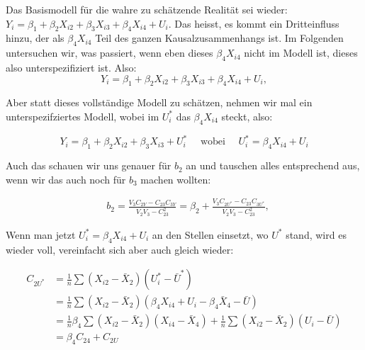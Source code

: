 \documentclass[
  10pt,
  letterpaper,
  a4paper, twoside]{scrreprt}
\begin{document}
\begin{tcolorbox}[enhanced jigsaw, coltitle=black, opacitybacktitle=0.6, toptitle=1mm, colbacktitle=quarto-callout-warning-color!10!white, colback=white, toprule=.15mm, opacityback=0, bottomrule=.15mm, arc=.35mm, colframe=quarto-callout-warning-color-frame, leftrule=.75mm, titlerule=0mm, breakable, left=2mm, rightrule=.15mm, title={IYI (∉ Klausur): Ableitung Modellspezifikation}, bottomtitle=1mm]

Das Basismodell für die wahre zu schätzende Realität sei wieder:
\(Y_i=\beta_1+\beta_2 X_{i 2}+\beta_3 X_{i 3}+\beta_4 X_{i 4} + U_i\).
Das heisst, es kommt ein Dritteinfluss hinzu, der als \(\beta_4X_{i 4}\)
Teil des ganzen Kausalzusammenhangs ist. Im Folgenden untersuchen wir,
was passiert, wenn eben dieses \(\beta_4X_{i 4}\) nicht im Modell ist,
dieses also unterspezifiziert ist. Also: \[
Y_i=\beta_1+\beta_2 X_{i 2}+\beta_3 X_{i 3}+\beta_4 X_{i 4}+U_i,
\]

Aber statt dieses vollständige Modell zu schätzen, nehmen wir mal ein
unterspezifziertes Modell, wobei im \(U_i^*\) das \(\beta_4X_{i 4}\)
steckt, also:

\[
Y_i=\beta_1+\beta_2 X_{i 2}+\beta_3 X_{i 3}+U_i^* \quad \text { wobei } \quad U_i^*=\beta_4 X_{i 4}+U_i
\]

Auch das schauen wir uns genauer für \(b_2\) an und tauschen alles
entsprechend aus, wenn wir das auch noch für \(b_3\) machen wollten:

\begin{align}
& b_2=\frac{V_3 C_{2 Y}-C_{23} C_{3 Y}}{V_2 V_3-C_{23}^2}=\beta_2+\frac{V_3 C_{2 U^*}-C_{23} C_{3 U^*}}{V_2 V_3-C_{23}^2}, 
\end{align}

Wenn man jetzt \(U_i^*=\beta_4 X_{i 4}+U_i\) an den Stellen einsetzt, wo
\(U^*\) stand, wird es wieder voll, vereinfacht sich aber auch gleich
wieder:

\begin{align}
C_{2 U^*} & =\frac{1}{n} \sum\left(X_{i 2}-\bar{X}_2\right)\left(U_i^*-\bar{U}^*\right)\\
&=\frac{1}{n} \sum\left(X_{i 2}-\bar{X}_2\right)\left(\beta_4 X_{i 4}+U_i-\beta_4 \bar{X}_4-\bar{U}\right) \\
& =\frac{1}{n} \beta_4 \sum\left(X_{i 2}-\bar{X}_2\right)\left(X_{i 4}-\bar{X}_4\right)+\frac{1}{n} \sum\left(X_{i 2}-\bar{X}_2\right)\left(U_i-\bar{U}\right) \\
& =\beta_4 C_{24}+C_{2 U} 
\end{align}


\end{tcolorbox}
\end{document}

